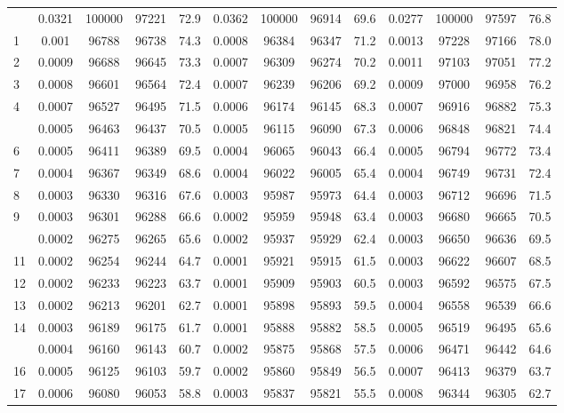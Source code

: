 \documentclass[
  14pt,
]{article}
\begin{document}
\begin{longtable}[t]{lcccccccccccc}
\endfoot
\bottomrule
\endlastfoot
0 & 0.0321 & 100000 & 97221 & 72.9 & 0.0362 & 100000 & 96914 & 69.6 & 0.0277 & 100000 & 97597 & 76.8\\
1 & 0.001 & 96788 & 96738 & 74.3 & 0.0008 & 96384 & 96347 & 71.2 & 0.0013 & 97228 & 97166 & 78.0\\
2 & 0.0009 & 96688 & 96645 & 73.3 & 0.0007 & 96309 & 96274 & 70.2 & 0.0011 & 97103 & 97051 & 77.2\\
3 & 0.0008 & 96601 & 96564 & 72.4 & 0.0007 & 96239 & 96206 & 69.2 & 0.0009 & 97000 & 96958 & 76.2\\
4 & 0.0007 & 96527 & 96495 & 71.5 & 0.0006 & 96174 & 96145 & 68.3 & 0.0007 & 96916 & 96882 & 75.3\\
\addlinespace
5 & 0.0005 & 96463 & 96437 & 70.5 & 0.0005 & 96115 & 96090 & 67.3 & 0.0006 & 96848 & 96821 & 74.4\\
6 & 0.0005 & 96411 & 96389 & 69.5 & 0.0004 & 96065 & 96043 & 66.4 & 0.0005 & 96794 & 96772 & 73.4\\
7 & 0.0004 & 96367 & 96349 & 68.6 & 0.0004 & 96022 & 96005 & 65.4 & 0.0004 & 96749 & 96731 & 72.4\\
8 & 0.0003 & 96330 & 96316 & 67.6 & 0.0003 & 95987 & 95973 & 64.4 & 0.0003 & 96712 & 96696 & 71.5\\
9 & 0.0003 & 96301 & 96288 & 66.6 & 0.0002 & 95959 & 95948 & 63.4 & 0.0003 & 96680 & 96665 & 70.5\\
\addlinespace
10 & 0.0002 & 96275 & 96265 & 65.6 & 0.0002 & 95937 & 95929 & 62.4 & 0.0003 & 96650 & 96636 & 69.5\\
11 & 0.0002 & 96254 & 96244 & 64.7 & 0.0001 & 95921 & 95915 & 61.5 & 0.0003 & 96622 & 96607 & 68.5\\
12 & 0.0002 & 96233 & 96223 & 63.7 & 0.0001 & 95909 & 95903 & 60.5 & 0.0003 & 96592 & 96575 & 67.5\\
13 & 0.0002 & 96213 & 96201 & 62.7 & 0.0001 & 95898 & 95893 & 59.5 & 0.0004 & 96558 & 96539 & 66.6\\
14 & 0.0003 & 96189 & 96175 & 61.7 & 0.0001 & 95888 & 95882 & 58.5 & 0.0005 & 96519 & 96495 & 65.6\\
\addlinespace
15 & 0.0004 & 96160 & 96143 & 60.7 & 0.0002 & 95875 & 95868 & 57.5 & 0.0006 & 96471 & 96442 & 64.6\\
16 & 0.0005 & 96125 & 96103 & 59.7 & 0.0002 & 95860 & 95849 & 56.5 & 0.0007 & 96413 & 96379 & 63.7\\
17 & 0.0006 & 96080 & 96053 & 58.8 & 0.0003 & 95837 & 95821 & 55.5 & 0.0008 & 96344 & 96305 & 62.7\\

\end{longtable}
\end{document}
